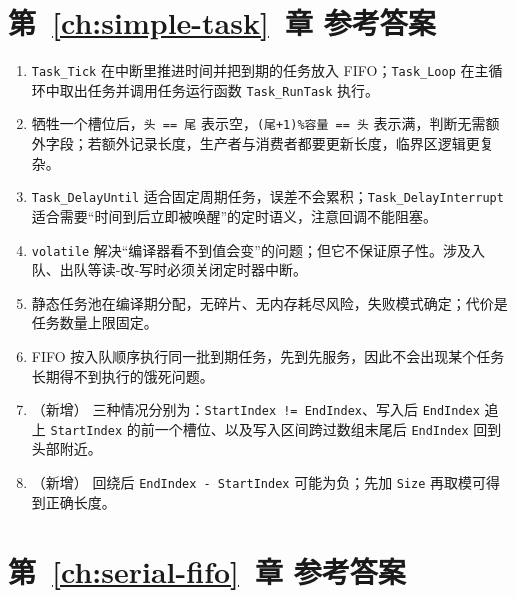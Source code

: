 \section*{第~\ref{ch:simple-task}~章 参考答案}

\begin{enumerate}
	\item \texttt{Task\_Tick} 在中断里推进时间并把到期的任务放入 FIFO；\texttt{Task\_Loop} 在主循环中取出任务并调用任务运行函数 \texttt{Task\_RunTask} 执行。
	\item 牺牲一个槽位后，\texttt{头 == 尾} 表示空，\texttt{(尾+1)\%容量 == 头} 表示满，判断无需额外字段；若额外记录长度，生产者与消费者都要更新长度，临界区逻辑更复杂。
	\item \texttt{Task\_DelayUntil} 适合固定周期任务，误差不会累积；\texttt{Task\_DelayInterrupt} 适合需要“时间到后立即被唤醒”的定时语义，注意回调不能阻塞。
	\item \texttt{volatile} 解决“编译器看不到值会变”的问题；但它不保证原子性。涉及入队、出队等读-改-写时必须关闭定时器中断。
	\item 静态任务池在编译期分配，无碎片、无内存耗尽风险，失败模式确定；代价是任务数量上限固定。
	\item FIFO 按入队顺序执行同一批到期任务，先到先服务，因此不会出现某个任务长期得不到执行的饿死问题。
	\item （新增） 三种情况分别为：\texttt{StartIndex != EndIndex}、写入后 \texttt{EndIndex} 追上 \texttt{StartIndex} 的前一个槽位、以及写入区间跨过数组末尾后 \texttt{EndIndex} 回到头部附近。
	\item （新增） 回绕后 \texttt{EndIndex - StartIndex} 可能为负；先加 \texttt{Size} 再取模可得到正确长度。
\end{enumerate}

\section*{第~\ref{ch:serial-fifo}~章 参考答案}

